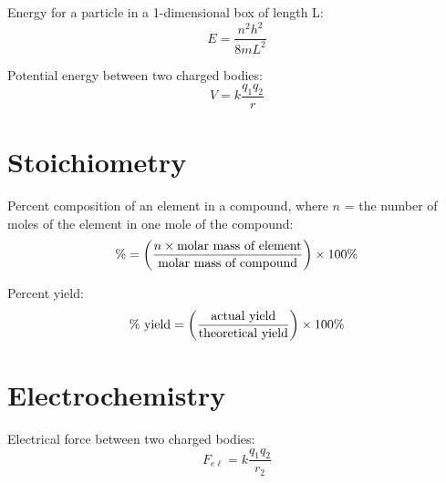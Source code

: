 \documentclass[10pt]{article}
\begin{document}
Energy for a particle in a 1-dimensional box of length L:
\begin{equation*}
E = \frac{n^2h^2}{8mL^2}
\end{equation*}

Potential energy between two charged bodies:
\begin{equation*}
V=k\frac{q_1q_2}{r}
\end{equation*}



\section{Stoichiometry}

Percent composition of an element in a compound, where $n$ = the number of moles of the element in one mole of the compound:
\begin{equation*}
\% = \left(\frac{n\times \textnormal{molar mass of element}}{\textnormal{molar mass of compound}}\right)\times 100\%
\end{equation*}

Percent yield:
\begin{equation*}
\textnormal{\% yield} = \left(\frac{\textnormal{actual yield}}{\textnormal{theoretical yield}}\right)\times 100\%
\end{equation*}


\newpage
\section{Electrochemistry}


Electrical force between two charged bodies:
\begin{equation*}
F_{e\ell}=k\frac{q_1q_2}{r_2}
\end{equation*}
\end{document}
